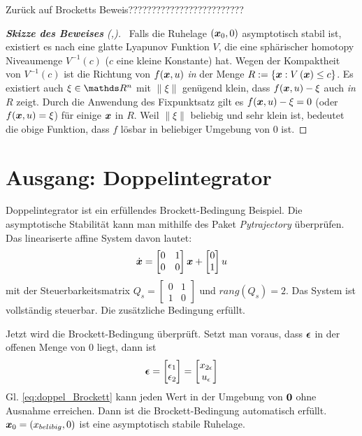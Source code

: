 Zurück auf Brocketts Beweis?????????????????????????

\begin{proof}[\textbf{Skizze des Beweises} (\cite{brockett1983asymptotic},\cite{liberzon2012switching})]~Falls die Ruhelage $(\boldsymbol x_{0},0)$ asymptotisch stabil ist, existiert es nach \cite{wilson1967structure} eine glatte Lyapunov Funktion $V$, die eine sphärischer homotopy Niveaumenge $V^{-1}(c)$ ($c$ eine kleine Konstante) hat. Wegen der Kompaktheit von $V^{-1}(c)$ ist die Richtung von $f(\boldsymbol x,u)$ \emph{in} der Menge $R:= \left \{ \boldsymbol x:V\left (\boldsymbol x  \right )\leq c \right \}$. Es existiert auch $\xi \in \Reals^{n}$ mit $\left \| \xi \right \|$ genügend klein, dass $f(\boldsymbol x,u)-\xi$ auch \emph{in} $R$ zeigt. Durch die Anwendung des Fixpunktsatz gilt es $f(\boldsymbol x,u)-\xi=0$ (oder $f(\boldsymbol x,u)=\xi$) für einige $\boldsymbol x$ in $R$. Weil $\left \| \xi \right \|$ beliebig und sehr klein ist, bedeutet die obige Funktion, dass $f$ lösbar in beliebiger Umgebung von 0 ist.
\end{proof} %

\section{Ausgang: Doppelintegrator}
\label{Doppelintegrator}
Doppelintegrator ist ein erfüllendes Brockett-Bedingung Beispiel. Die asymptotische Stabilität kann man mithilfe des Paket \emph{Pytrajectory} überprüfen. Das lineariserte affine System davon lautet:
\begin{eqnarray}
\dot{\boldsymbol x} = \begin{bmatrix}
0 & 1\\ 
0 & 0
\end{bmatrix}\boldsymbol x + \begin{bmatrix}
0\\1 
\end{bmatrix}u
\label{eq:doppel_Sytemzustand}
\end{eqnarray}
mit der Steuerbarkeitsmatrix $Q_{s} = \begin{bmatrix}
0 & 1\\ 
1 & 0
\end{bmatrix}$ und $rang(Q_{s})=2$. Das System ist vollständig steuerbar. Die zusätzliche Bedingung erfüllt.

Jetzt wird die Brockett-Bedingung überprüft. Setzt man voraus, dass $\boldsymbol \epsilon$ in der offenen Menge von $0$ liegt, dann ist 
\begin{eqnarray}
\boldsymbol \epsilon  = \begin{bmatrix}
\epsilon _{1}\\ \epsilon_{2}
\end{bmatrix} = 
\begin{bmatrix}
x_{2\epsilon }\\ u_{\epsilon }
\end{bmatrix}
\label{eq:doppel_Brockett}
\end{eqnarray}
Gl. \ref{eq:doppel_Brockett} kann jeden Wert in der Umgebung von $\boldsymbol 0$ ohne Ausnahme erreichen. Dann ist die Brockett-Bedingung automatisch erfüllt. $\boldsymbol x_{0} = (x_{belibig}, 0)$ ist eine asymptotisch stabile Ruhelage.

